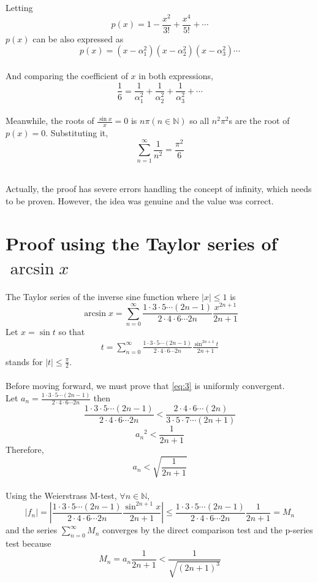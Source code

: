 Letting
\[
    p(x)=1 - \frac{x^2}{3!} + \frac{x^4}{5!}+\cdots
\]
$p(x)$ can be also expressed as
\[
    p(x)=(x-\alpha_1^2)(x-\alpha_2^2)(x-\alpha_3^2)\cdots
\]~\\
And comparing the coefficient of $x$ in both expressions,
\[
    \frac{1}{6}=\frac{1}{\alpha_1^2}+\frac{1}{\alpha_2^2}+\frac{1}{\alpha_3^2}+\cdots
\]~\\

Meanwhile, the roots of $\frac{\sin x}{x} = 0$ is $n\pi (n \in \mathbb{N})$ so all $n^2\pi^2$s are the root of $p(x)=0$. Substituting it,
\[
    \sum_{n=1}^\infty \frac{1}{n^2} = \frac{\pi^2}{6}
\]
~\\
\begin{remark}
    Actually, the proof has severe errors handling the concept of infinity, which needs to be proven. However, the idea was genuine and the value was correct.
\end{remark}

\newpage
\section{Proof using the Taylor series of $\arcsin x $~}
The Taylor series of the inverse sine function where $|x| \leq 1$ is
\[
    \arcsin x = \sum_{n=0}^\infty \frac{1\cdot3\cdot5\cdots(2n-1)}{2\cdot4\cdot6\cdots2n} \frac{x^{2n+1}}{2n+1}
\]
Let $x = \sin t$ so that
\begin{align}
    t = \sum_{n=0}^\infty \frac{1\cdot3\cdot5\cdots(2n-1)}{2\cdot4\cdot6\cdots2n} \frac{\sin^{2n+1}t}{2n+1}\tag{3}\label{eq:3}
\end{align}
stands for $|t| \leq \frac{\pi}{2}$.~\\\\

Before moving forward, we must prove that \eqref{eq:3} is uniformly convergent.~\\

Let $a_n = \frac{1\cdot3\cdot5\cdots(2n-1)}{2\cdot4\cdot6\cdots2n}$ then
\[
    \frac{1\cdot3\cdot5\cdots(2n-1)}{2\cdot4\cdot6\cdots2n} < \frac{2\cdot4\cdot6\cdots(2n)}{3\cdot5\cdot7\cdots(2n+1)}
\]
\[
    {a_n}^2 < \frac{1}{2n+1}
\]
Therefore,
\[
    a_n < \sqrt{\frac{1}{2n+1}}
\]
~\\

Using the Weierstrass M-test, $\forall n \in \mathbb{N}$,
\[
     |f_n| = |\frac{1\cdot3\cdot5\cdots(2n-1)}{2\cdot4\cdot6\cdots2n} \frac{\sin^{2n+1}x}{2n+1}| \leq \frac{1\cdot3\cdot5\cdots(2n-1)}{2\cdot4\cdot6\cdots2n} \frac{1}{2n+1} = M_n
\]
and the series $\sum_{n=0}^\infty M_n$ converges by the direct comparison test and the p-series test because
\[M_n = a_n\frac{1}{2n+1} < \frac{1}{\sqrt{(2n+1)^3}}\]~\\


